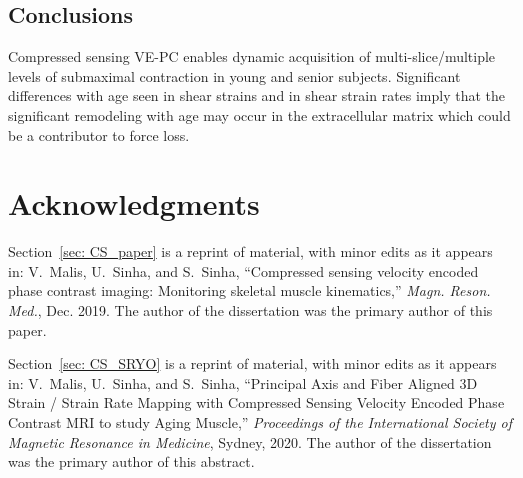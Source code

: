 \subsection{Conclusions}
Compressed sensing VE-PC enables dynamic acquisition of multi-slice/multiple levels of submaximal contraction in young and senior subjects. 
Significant differences with age seen in shear strains and in shear strain rates imply that the significant remodeling with age may occur in the extracellular matrix which could be a contributor to force loss. 
\section{Acknowledgments}
Section~\ref{sec: CS_paper} is a reprint of material, with minor edits as it appears in: V.~Malis, U.~Sinha, and S.~Sinha, ``Compressed sensing velocity encoded phase contrast imaging: Monitoring skeletal muscle kinematics,'' \emph{Magn. Reson. Med.}, Dec. 2019.
The author of the dissertation was the primary author of this paper.

Section~\ref{sec: CS_SRYO} is a reprint of material, with minor edits as it appears in: V.~Malis, U.~Sinha, and S.~Sinha, ``Principal Axis and Fiber Aligned 3D Strain / Strain Rate Mapping with Compressed Sensing Velocity Encoded Phase Contrast MRI to study Aging Muscle,'' \emph{Proceedings of the International Society of Magnetic Resonance in Medicine}, Sydney, 2020.
The author of the dissertation was the primary author of this abstract.